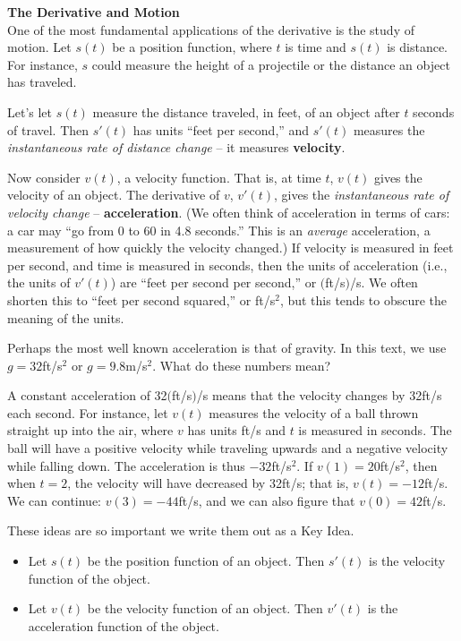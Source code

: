 \noindent\textbf{\large The Derivative and Motion}\\

One of the most fundamental applications of the derivative is the study of motion. Let $s(t)$ be a position function, where $t$ is time and $s(t)$ is  distance. For instance, $s$ could measure the height of a projectile or the distance an object has traveled. 

Let's let $s(t)$ measure the distance traveled, in feet, of an object after $t$ seconds of travel. Then $s'(t)$ has units ``feet per second,'' and $s'(t)$ measures the \textit{instantaneous rate of distance change} -- it measures \textbf{velocity}. 

Now consider $v(t)$, a velocity function. That is, at time $t$, $v(t)$ gives the velocity of an object. The derivative of $v$, $v'(t)$, gives the \textit{instantaneous rate of velocity change} --
\textbf{acceleration}. (We often think of acceleration in terms of cars: a car may ``go from 0 to 60 in 4.8 seconds.'' This is an \textit{average} acceleration, a measurement of how quickly the velocity changed.) If velocity is measured in feet per second, and time is measured in seconds, then the units of acceleration (i.e., the units of $v'(t)$) are ``feet per second per second,'' or $($ft/s$)$/s. We often shorten this to ``feet per second squared,'' or ft/s$^2$, but this tends to obscure the meaning of the units.

Perhaps the most well known acceleration is that of gravity. In this text, we use $g=32$ft/s$^2$ or $g=9.8$m/s$^2$. What do these numbers mean?

A constant acceleration of 32$($ft/s$)$/s means that the velocity changes by 32ft/s each second. For instance, let $v(t)$ measures the velocity of a ball thrown straight up into the air, where $v$ has units ft/s and $t$ is measured in seconds. The ball will have a positive velocity while traveling upwards and a negative velocity while falling down. The acceleration is thus $-32$ft/s$^2$. If $v(1) = 20$ft/s$^2$, then when $t=2$, the velocity will have decreased by 32ft/s; that is, $v(t) = -12$ft/s. We can continue: $v(3) = -44$ft/s, and we can also figure that $v(0) = 42$ft/s.

These ideas are so important we write them out as a Key Idea.

{\begin{itemize}
	\item Let $s(t)$ be the position function of an object. Then $s'(t)$ is the velocity function of the object.
	\item	Let $v(t)$ be the velocity function of an object. Then $v'(t)$ is the acceleration function of the object.
\end{itemize}
}

